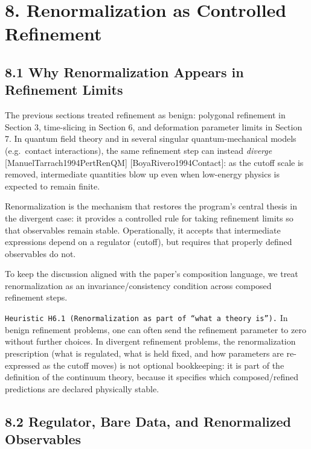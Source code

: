 \documentclass[
]{article}
\begin{document}
\hypertarget{renormalization-as-controlled-refinement}{%
\section{8. Renormalization as Controlled
Refinement}\label{renormalization-as-controlled-refinement}}

\hypertarget{why-renormalization-appears-in-refinement-limits}{%
\subsection{8.1 Why Renormalization Appears in Refinement
Limits}\label{why-renormalization-appears-in-refinement-limits}}

The previous sections treated refinement as benign: polygonal refinement
in Section 3, time-slicing in Section 6, and deformation parameter
limits in Section 7. In quantum field theory and in several singular
quantum-mechanical models (e.g.~contact interactions), the same
refinement step can instead \emph{diverge}
{[}ManuelTarrach1994PertRenQM{]} {[}BoyaRivero1994Contact{]}: as the
cutoff scale is removed, intermediate quantities blow up even when
low-energy physics is expected to remain finite.

Renormalization is the mechanism that restores the program's central
thesis in the divergent case: it provides a controlled rule for taking
refinement limits so that observables remain stable. Operationally, it
accepts that intermediate expressions depend on a regulator (cutoff),
but requires that properly defined observables do not.

To keep the discussion aligned with the paper's composition language, we
treat renormalization as an invariance/consistency condition across
composed refinement steps.

\texttt{Heuristic\ H6.1\ (Renormalization\ as\ part\ of\ “what\ a\ theory\ is”).}
In benign refinement problems, one can often send the refinement
parameter to zero without further choices. In divergent refinement
problems, the renormalization prescription (what is regulated, what is
held fixed, and how parameters are re-expressed as the cutoff moves) is
not optional bookkeeping: it is part of the definition of the continuum
theory, because it specifies which composed/refined predictions are
declared physically stable.

\hypertarget{regulator-bare-data-and-renormalized-observables}{%
\subsection{8.2 Regulator, Bare Data, and Renormalized
Observables}\label{regulator-bare-data-and-renormalized-observables}}
\end{document}
